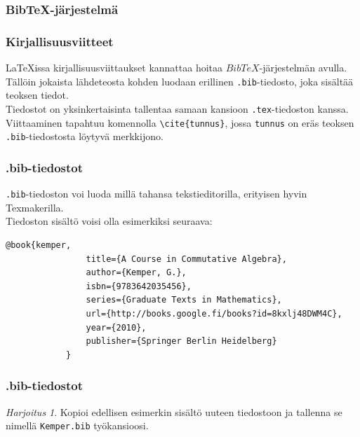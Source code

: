 \documentclass[handout,hyperref={colorlinks=true}]{beamer}
\theoremstyle{remark}
\newtheorem{harj}{Harjoitus}[section]
\newcommand{\vaihto}{\\ \vspace{10pt}}
\newcommand{\BibTeX}{BibTeX}
\begin{document}
\subsubsection{BibTeX-järjestelmä}
\begin{frame}[fragile]
    \frametitle{Kirjallisuusviitteet}
    \LaTeX issa kirjallisuusviittaukset kannattaa hoitaa \(\BibTeX\)-järjestelmän avulla. 
    \vaihto
    Tällöin jokaista lähdeteosta kohden luodaan erillinen \verb-.bib--tiedosto, joka sisältää teoksen tiedot. 
    \vaihto
    Tiedostot on yksinkertaisinta tallentaa samaan kansioon \verb-.tex--tiedoston kanssa.
    \vaihto
    Viittaaminen tapahtuu komennolla \verb-\cite{tunnus}-, jossa \verb-tunnus- on eräs teoksen \verb-.bib--tiedostosta löytyvä merkkijono.
\end{frame}
\begin{frame}[fragile]
    \frametitle{.bib-tiedostot}
    \verb-.bib--tiedoston voi luoda millä tahansa tekstieditorilla, erityisen hyvin Texmakerilla. 
    \vaihto
    Tiedoston sisältö voisi olla esimerkiksi seuraava:\vaihto
    \begin{scriptsize}
        \begin{Verbatim}[frame=single]
            @book{kemper,
                title={A Course in Commutative Algebra},
                author={Kemper, G.},
                isbn={9783642035456},
                series={Graduate Texts in Mathematics},
                url={http://books.google.fi/books?id=8kxlj48DWM4C},
                year={2010},
                publisher={Springer Berlin Heidelberg}
            }
        \end{Verbatim}
    \end{scriptsize}
\end{frame}
\begin{frame}[fragile]
    \frametitle{.bib-tiedostot}
    \begin{harj}
        Kopioi edellisen esimerkin sisältö uuteen tiedostoon ja tallenna se nimellä \verb-Kemper.bib- työkansioosi. 
    \end{harj}
\end{frame}
\end{document}
